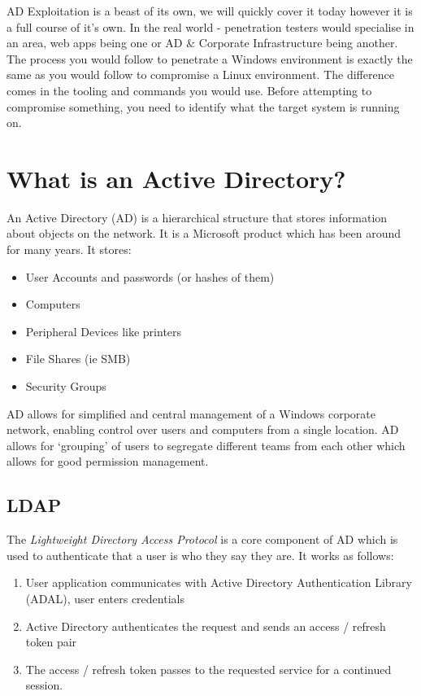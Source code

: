 
AD Exploitation is a beast of its own, we will quickly cover it today however it is a full course of it's own. In the real world - penetration testers would specialise in an area, web apps being one or AD \& Corporate Infrastructure being another.\\

The process you would follow to penetrate a Windows environment is exactly the same as you would follow to compromise a Linux environment. The difference comes in the tooling and commands you would use. Before attempting to compromise something, you need to identify what the target system is running on. 

\section{What is an Active Directory?}
An Active Directory (AD) is a hierarchical structure that stores information about objects on the network. It is a Microsoft product which has been around for many years. It stores:
\begin{itemize}
    \item User Accounts and passwords (or hashes of them)
    \item Computers
    \item Peripheral Devices like printers
    \item File Shares (ie SMB)
    \item Security Groups
\end{itemize}

AD allows for simplified and central management of a Windows corporate network, enabling control over users and computers from a single location. AD allows for `grouping' of users to segregate different teams from each other which allows for good permission management.

\subsection{LDAP}
The \textit{Lightweight Directory Access Protocol} is a core component of AD which is used to authenticate that a user is who they say they are. It works as follows:
\begin{enumerate}
    \item User application communicates with Active Directory Authentication Library (ADAL), user enters credentials
    \item Active Directory authenticates the request and sends an access / refresh token pair
    \item The access / refresh token passes to the requested service for a continued session.
\end{enumerate}

